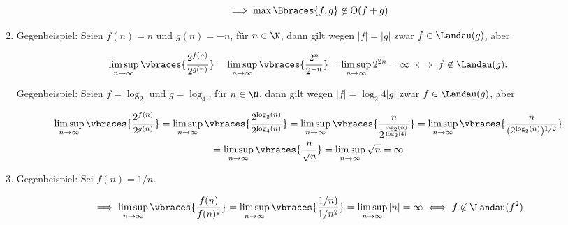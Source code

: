 \begin{solution}
\begin{enumerate}[label = (\alph*)]
  \begin{align*}
    \implies
    \max \Bbraces{f, g} \not \in \Theta(f + g)
  \end{align*}

  \item Gegenbeispiel:
  Seien $f(n) = n$ und $g(n) = -n$, für $n \in \N$, dann gilt wegen $|f| = |g|$ zwar $f \in \Landau(g)$, aber

  \begin{align*}
    \limsup_{n \to \infty}
    \vbraces
    {
      \frac
      {
        2^{f(n)}
      }{
        2^{g(n)}
      }
    }
    =
    \limsup_{n \to \infty}
    \vbraces
    {
      \frac
      {
        2^{n}
      }{
        2^{-n}
      }
    }
    =
    \limsup_{n \to \infty}
    2^{2n}
    =
    \infty
    \iff
    f \not \in \Landau(g).
  \end{align*}

  Gegenbeispiel:
  Seien $f = \log_2$ und $g = \log_4$, für $n \in \N$, dann gilt wegen $|f| = \log_2{4} |g|$ zwar $f \in \Landau(g)$, aber

  \begin{multline*}
    \limsup_{n  \to \infty}
    \vbraces
    {
      \frac
      {
        2^{f(n)}
      }{
        2^{g(n)}
      }
    }
    =
    \limsup_{n  \to \infty}
    \vbraces
    {
      \frac
      {
        2^{\log_2(n)}
      }{
        2^{\log_4(n)}
      }
    }
    =
    \limsup_{n  \to \infty}
    \vbraces
    {
      \frac
      {
        n
      }{
        2^\frac
        {
          \log_2(n)
        }{
          \log_2(4)
        }
      }
    }
    =
    \limsup_{n  \to \infty}
    \vbraces
    {
      \frac
      {
        n
      }{
        (2^{\log_2(n)})^{1/2}
      }
    } \\
    =
    \limsup_{n  \to \infty}
    \vbraces
    {
      \frac
      {
        n
      }{
        \sqrt{n}
      }
    }
    =
    \limsup_{n  \to \infty}
    \sqrt{n}
    =
    \infty
  \end{multline*}

  \item Gegenbeispiel:
  Sei $f(n) = 1/n$.

  \begin{align*}
    \implies
    \limsup_{n \to \infty}
    \vbraces
    {
      \frac{f(n)}{f(n)^2}
    }
    =
    \limsup_{n \to \infty}
    \vbraces
    {
      \frac{1/n)}{1/n^2}
    }
    =
    \limsup_{n \to \infty} |n|
    =
    \infty
    \iff
    f \not \in \Landau(f^2)
  \end{align*}


\end{enumerate}
\end{solution}
